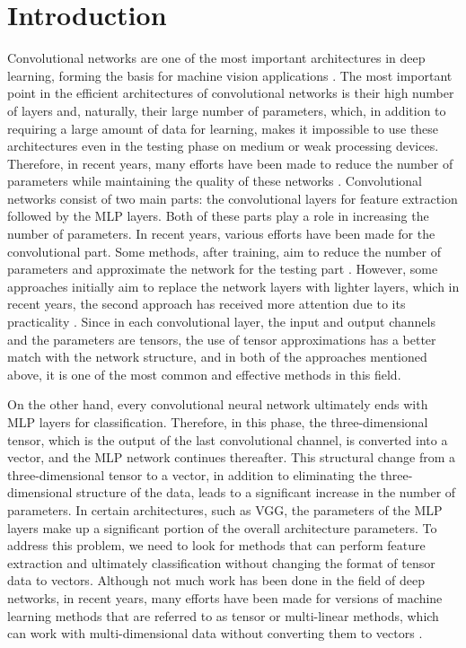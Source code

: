 \documentclass{article}
\begin{document}
\section{Introduction}
\label{sec:introduction}
Convolutional networks are one of the most important architectures in deep learning, forming the basis for machine vision applications \cite{r35}. The most important point in the efficient architectures of convolutional networks is their high number of layers and, naturally, their large number of parameters, which, in addition to requiring a large amount of data for learning, makes it impossible to use these architectures even in the testing phase on medium or weak processing devices. Therefore, in recent years, many efforts have been made to reduce the number of parameters while maintaining the quality of these networks \cite{r1,r2,r3,r4}. Convolutional networks consist of two main parts: the convolutional layers for feature extraction followed by the MLP layers. Both of these parts play a role in increasing the number of parameters. In recent years, various efforts have been made for the convolutional part. Some methods, after training, aim to reduce the number of parameters and approximate the network for the testing part \cite{r36}. However, some approaches initially aim to replace the network layers with lighter layers, which in recent years, the second approach has received more attention due to its practicality \cite{r32}. Since in each convolutional layer, the input and output channels and the parameters are tensors, the use of tensor approximations has a better match with the network structure, and in both of the approaches mentioned above, it is one of the most common and effective methods in this field.

On the other hand, every convolutional neural network ultimately ends with MLP layers for classification. Therefore, in this phase, the three-dimensional tensor, which is the output of the last convolutional channel, is converted into a vector, and the MLP network continues thereafter. This structural change from a three-dimensional tensor to a vector, in addition to eliminating the three-dimensional structure of the data, leads to a significant increase in the number of parameters. In certain architectures, such as VGG, the parameters of the MLP layers make up a significant portion of the overall architecture parameters. To address this problem, we need to look for methods that can perform feature extraction and ultimately classification without changing the format of tensor data to vectors. Although not much work has been done in the field of deep networks, in recent years, many efforts have been made for versions of machine learning methods that are referred to as tensor or multi-linear methods, which can work with multi-dimensional data without converting them to vectors \cite{r1,r2,r3,r4,r5,r6,r7}.
\end{document}
